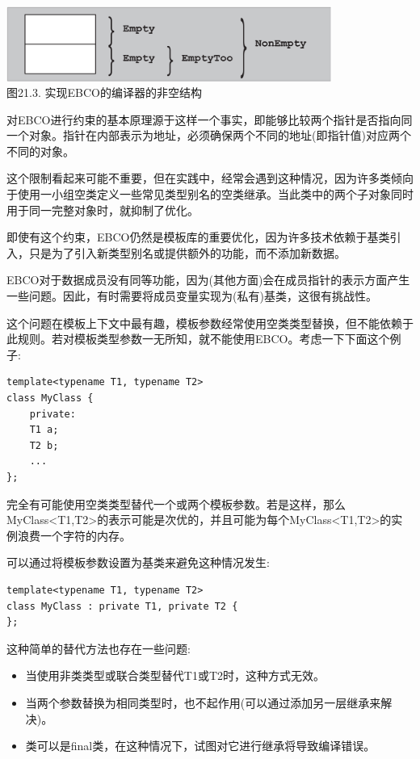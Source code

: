 \begin{center}
\includegraphics[width=0.8\textwidth]{content/3/chapter21/images/3.png} \\
图21.3. 实现EBCO的编译器的非空结构
\end{center}

对EBCO进行约束的基本原理源于这样一个事实，即能够比较两个指针是否指向同一个对象。指针在内部表示为地址，必须确保两个不同的地址(即指针值)对应两个不同的对象。

这个限制看起来可能不重要，但在实践中，经常会遇到这种情况，因为许多类倾向于使用一小组空类定义一些常见类型别名的空类继承。当此类中的两个子对象同时用于同一完整对象时，就抑制了优化。

即使有这个约束，EBCO仍然是模板库的重要优化，因为许多技术依赖于基类引入，只是为了引入新类型别名或提供额外的功能，而不添加新数据。


EBCO对于数据成员没有同等功能，因为(其他方面)会在成员指针的表示方面产生一些问题。因此，有时需要将成员变量实现为(私有)基类，这很有挑战性。

这个问题在模板上下文中最有趣，模板参数经常使用空类类型替换，但不能依赖于此规则。若对模板类型参数一无所知，就不能使用EBCO。考虑一下下面这个例子:

\begin{lstlisting}[style=styleCXX]
template<typename T1, typename T2>
class MyClass {
	private:
	T1 a;
	T2 b;
	...
};
\end{lstlisting}

完全有可能使用空类类型替代一个或两个模板参数。若是这样，那么MyClass<T1,T2>的表示可能是次优的，并且可能为每个MyClass<T1,T2>的实例浪费一个字符的内存。

可以通过将模板参数设置为基类来避免这种情况发生:

\begin{lstlisting}[style=styleCXX]
template<typename T1, typename T2>
class MyClass : private T1, private T2 {
};
\end{lstlisting}

这种简单的替代方法也存在一些问题:

\begin{itemize}
\item 
当使用非类类型或联合类型替代T1或T2时，这种方式无效。

\item 
当两个参数替换为相同类型时，也不起作用(可以通过添加另一层继承来解决)。

\item 
类可以是final类，在这种情况下，试图对它进行继承将导致编译错误。
\end{itemize}

